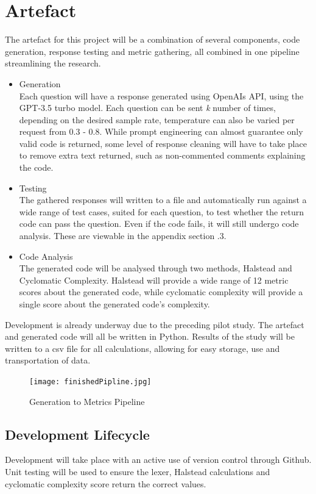 \documentclass[manuscript,screen,review,sigconf]{acmart}
\begin{document}
\section{Artefact}
The artefact for this project will be a combination of several components, code generation, response testing and metric gathering, all combined in one pipeline streamlining the research.
\begin{itemize}
    \item Generation\\
    Each question will have a response generated using OpenAIs API, using the GPT-3.5 turbo model. Each question can be sent \textit{k} number of times, depending on the desired sample rate, temperature can also be varied per request from 0.3 - 0.8. While prompt engineering can almost guarantee only valid code is returned, some level of response cleaning will have to take place to remove extra text returned, such as non-commented comments explaining the code.
    \item Testing\\
    The gathered responses will written to a file and automatically run against a wide range of test cases, suited for each question, to test whether the return code can pass the question. Even if the code fails, it will still undergo code analysis. These are viewable in the appendix section .3.
    \item Code Analysis\\
    The generated code will be analysed through two methods, Halstead and Cyclomatic Complexity. Halstead will provide a wide range of 12 metric scores about the generated code, while cyclomatic complexity will provide a single score about the generated code's complexity.
\end{itemize}

Development is already underway due to the preceding pilot study. The artefact and generated code will all be written in Python. Results of the study will be written to a csv file for all calculations, allowing for easy storage, use and transportation of data.

\begin{figure}[h]
    \texttt{[image: finishedPipline.jpg]}
    \caption{Generation to Metrics Pipeline}
    \label{fig:CC Pipeline}
    \centering
\end{figure}

\subsection{Development Lifecycle}
Development will take place with an active use of version control through Github.
Unit testing will be used to ensure the lexer, Halstead calculations and cyclomatic complexity score return the correct values.
\end{document}
